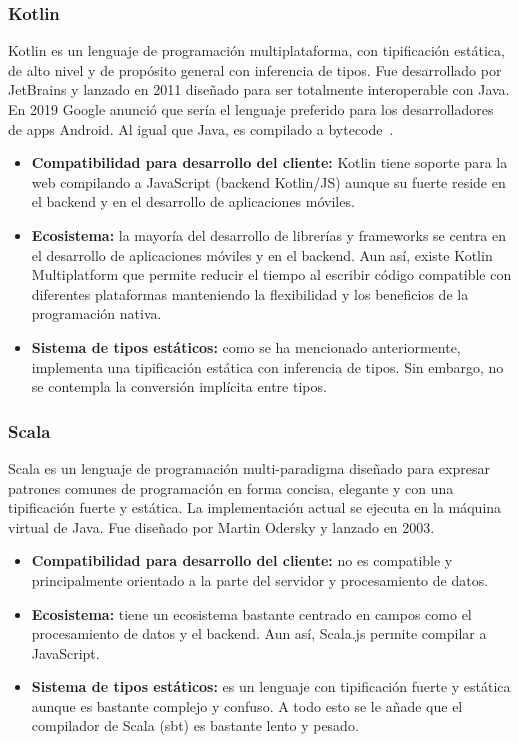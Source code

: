 \subsubsection{Kotlin}

Kotlin es un lenguaje de programación multiplataforma, con tipificación estática, de alto nivel y de propósito general con inferencia de tipos. Fue desarrollado por JetBrains y lanzado en 2011 diseñado para ser totalmente interoperable con Java. En 2019 Google anunció que sería el lenguaje preferido para los desarrolladores de apps Android. Al igual que Java, es compilado a bytecode~\cite{kotlin-wiki}.

\begin{itemize}
    \item[\mal] \textbf{Compatibilidad para desarrollo del cliente:} Kotlin tiene soporte para la web compilando a JavaScript (backend Kotlin/JS) aunque su fuerte reside en el backend y en el desarrollo de aplicaciones móviles.
    \item[\regular] \textbf{Ecosistema:} la mayoría del desarrollo de librerías y frameworks se centra en el desarrollo de aplicaciones móviles y en el backend. Aun así, existe Kotlin Multiplatform que permite reducir el tiempo al escribir código compatible con diferentes plataformas manteniendo la flexibilidad y los beneficios de la programación nativa.
    \item[\bien] \textbf{Sistema de tipos estáticos:} como se ha mencionado anteriormente, implementa una tipificación estática con inferencia de tipos. Sin embargo, no se contempla la conversión implícita entre tipos.
\end{itemize}

\subsubsection{Scala}

Scala es un lenguaje de programación multi-paradigma diseñado para expresar patrones comunes de programación en forma concisa, elegante y con una tipificación fuerte y estática. La implementación actual se ejecuta en la máquina virtual de Java. Fue diseñado por Martin Odersky y lanzado en 2003.

\begin{itemize}
    \item[\mal] \textbf{Compatibilidad para desarrollo del cliente:} no es compatible y principalmente orientado a la parte del servidor y procesamiento de datos.
    \item[\mal] \textbf{Ecosistema:} tiene un ecosistema bastante centrado en campos como el procesamiento de datos y el backend. Aun así, Scala.js permite compilar a JavaScript.
    \item[\regular] \textbf{Sistema de tipos estáticos:} es un lenguaje con tipificación fuerte y estática aunque es bastante complejo y confuso. A todo esto se le añade que el compilador de Scala (sbt) es bastante lento y pesado.
\end{itemize}

